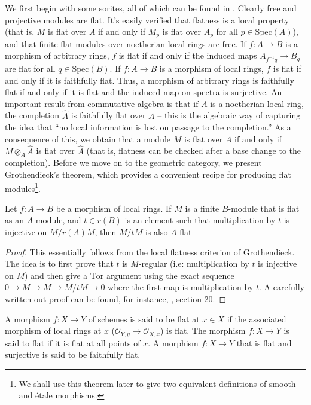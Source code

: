 \noindent
We first begin with some sorites, all of which can be found in \cite{MatCA}.
Clearly free and projective modules are flat. It's easily verified that
flatness is a local property (that is, $M$ is flat over $A$ if and only if
$M_p$ is flat over $A_p$ for all $p \in \text{Spec}(A)$), and that finite flat
modules over noetherian local rings are free. If $f:A \to B$ is a morphism of
arbitrary rings, $f$ is flat if and only if the induced maps
$A_{f^{-1}q} \to B_q$ are flat for all $q \in \text{Spec}(B)$. If $f:A \to B$ is a
morphism of local rings, $f$ is flat if and only if it is faithfully flat.
Thus, a morphism of arbitrary rings is faithfully flat if and only if it is
flat and the induced map on spectra is surjective. An important result from
commutative algebra is that if $A$ is a noetherian local ring, the completion
$\widehat{A}$ is faithfully flat over $A$ -- this is the algebraic way of
capturing the idea that ``no local information is lost on passage to the
completion.'' As a consequence of this, we obtain that a module $M$ is flat
over $A$ if and only if $M \otimes_A \widehat{A}$ is flat over $\widehat{A}$
(that is, flatness can be checked after a base change to the completion).
Before we move on to the geometric category, we present Grothendieck's
theorem, which provides a convenient recipe for producing flat
modules\footnote{We shall use this theorem later to give two equivalent
definitions of smooth and \'etale morphisms.}.

\begin{theorem}[Grothendieck]
\label{theorem-flatness-grothendieck}
Let $f:A \to B$ be a morphism of local rings. If $M$ is a finite $B$-module
that is flat as an $A$-module, and $t \in r(B)$ is an element such that
multiplication by $t$ is injective on $M/r(A)M$, then $M/tM$ is also
$A$-flat
\end{theorem}

\begin{proof}
This essentially follows from the local flatness criterion of Grothendieck.
The idea is to first prove that $t$ is $M$-regular (i.e: multiplication by
$t$ is injective on $M$) and then give a $\mathrm{Tor}$ argument using the
exact sequence $0 \to M \to M \to M/tM \to 0$ where the first map is
multiplication by $t$. A carefully written out proof can be found, for
instance, \cite{MatCA}, section 20.
\end{proof}

\begin{definition}
\label{definition-flat-schemes}
A morphism $f:X \to Y$ of schemes is said to be flat at $x \in X$ if the
associated morphism of local rings at $x$ 
($\mathcal{O}_{Y,y} \to \mathcal{O}_{X,x}$) is flat.
The morphism $f:X \to Y$ is said to flat if it is flat at all points of $x$.
A morphism $f:X \to Y$ that is flat and surjective is said to be faithfully
flat.
\end{definition}

